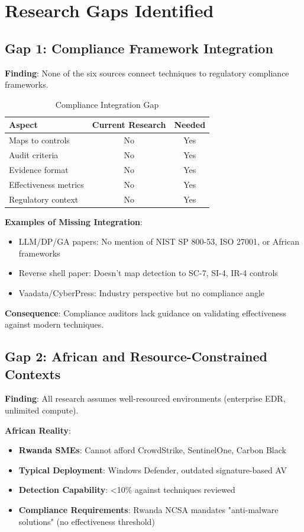 \documentclass[11pt,conference]{IEEEtran}
\begin{document}
\section{Research Gaps Identified}

\subsection{Gap 1: Compliance Framework Integration}

\textbf{Finding}: None of the six sources connect techniques to regulatory compliance frameworks.

\begin{table}[h]
\centering
\caption{Compliance Integration Gap}
\begin{tabular}{|l|c|c|}
\hline
\textbf{Aspect} & \textbf{Current Research} & \textbf{Needed} \\
\hline
Maps to controls & No & Yes \\
\hline
Audit criteria & No & Yes \\
\hline
Evidence format & No & Yes \\
\hline
Effectiveness metrics & No & Yes \\
\hline
Regulatory context & No & Yes \\
\hline
\end{tabular}
\end{table}

\textbf{Examples of Missing Integration}:
\begin{itemize}
    \item LLM/DP/GA papers: No mention of NIST SP 800-53, ISO 27001, or African frameworks
    \item Reverse shell paper: Doesn't map detection to SC-7, SI-4, IR-4 controls
    \item Vaadata/CyberPress: Industry perspective but no compliance angle
\end{itemize}

\textbf{Consequence}: Compliance auditors lack guidance on validating effectiveness against modern techniques.

\subsection{Gap 2: African and Resource-Constrained Contexts}

\textbf{Finding}: All research assumes well-resourced environments (enterprise EDR, unlimited compute).

\textbf{African Reality}:
\begin{itemize}
    \item \textbf{Rwanda SMEs}: Cannot afford CrowdStrike, SentinelOne, Carbon Black
    \item \textbf{Typical Deployment}: Windows Defender, outdated signature-based AV
    \item \textbf{Detection Capability}: <10\% against techniques reviewed
    \item \textbf{Compliance Requirements}: Rwanda NCSA mandates "anti-malware solutions" (no effectiveness threshold)
\end{itemize}
\end{document}
